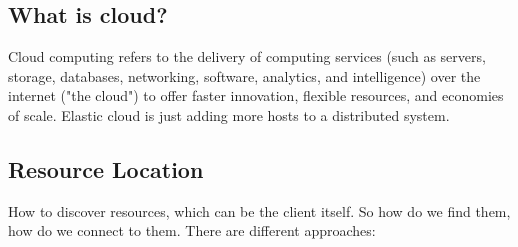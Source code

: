 \subsection{What is cloud?}
Cloud computing refers to the delivery of computing services (such as servers, storage, databases, networking, software, analytics, and intelligence) over the internet ("the cloud") to offer faster innovation, flexible resources, and economies of scale.
Elastic cloud is just adding more hosts to a distributed system.

\subsection{Resource Location}

How to discover resources, which can be the client itself. So how do we find them, how do we connect to them. There are different approaches:

